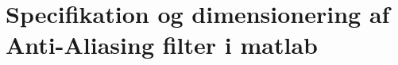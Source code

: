 \chapter{Specifikation og dimensionering af Anti-Aliasing filter i matlab}
\label{bilag:aafilterspec}

